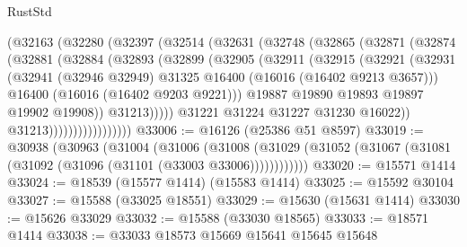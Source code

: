 \begin{lexlean}{RustStd}
\begin{coremodule}
                      (@32163
                        (@32280
                          (@32397
                            (@32514
                              (@32631
                                (@32748
                                  (@32865
                                    (@32871
                                      (@32874
                                        (@32881
                                          (@32884
                                            (@32893
                                              (@32899
                                                (@32905
                                                  (@32911
                                                    (@32915
                                                      (@32921
                                                        (@32931
                                                          (@32941
                                                            (@32946 @32949)
                                                            @31325
                                                            @16400
                                                            (@16016 (@16402 @9213 @3657)))
                                                          @16400
                                                          (@16016 (@16402 @9203 @9221)))
                                                        @19887
                                                        @19890
                                                        @19893
                                                        @19897
                                                        @19902
                                                        @19908))
                                                    @31213)))))
                                          @31221
                                          @31224
                                          @31227
                                          @31230
                                          @16022))
                                      @31213)))))))))))))))))
@33006 := @16126 (@25386 @51 @8597)
@33019 := @30938
    (@30963
      (@31004
        (@31006
          (@31008 (@31029 (@31052 (@31067 (@31081 (@31092 (@31096 (@31101 (@33003 @33006))))))))))))
@33020 := @15571 @1414
@33024 := @18539 (@15577 @1414) (@15583 @1414)
@33025 := @15592 @30104
@33027 := @15588 (@33025 @18551)
@33029 := @15630 (@15631 @1414)
@33030 := @15626 @33029
@33032 := @15588 (@33030 @18565)
@33033 := @18571 @1414
@33038 := @33033 @18573 @15669 @15641 @15645 @15648

\end{coremodule}
\end{lexlean}

